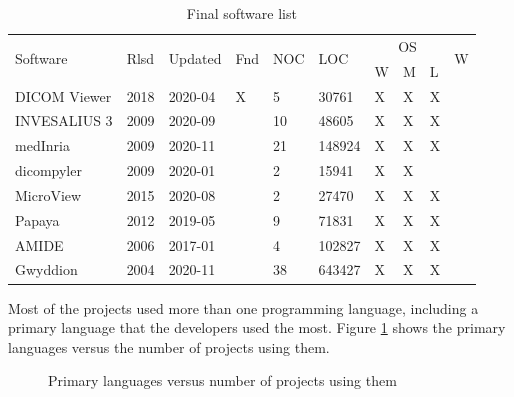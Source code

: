 \begin{table}[H]
\begin{tabular}{llllllllll}
\hline
\multirow{2}{*}{Software} & \multirow{2}{*}{Rlsd} & \multirow{2}{*}{Updated} & \multirow{2}{*}{Fnd} & \multirow{2}{*}{NOC} & \multirow{2}{*}{LOC} & \multicolumn{3}{c}{OS} & \multirow{2}{*}{W} \\ \cline{7-9}
 &  &  &  &  &  & W & M & L &  \\ \hline
DICOM Viewer \cite{Afsar2021} & 2018 & 2020-04 & X & 5 & 30761 & X & X & X &  \\
INVESALIUS 3 \cite{Amorim2015} & 2009 & 2020-09 &  & 10 & 48605 & X & X & X &  \\
medInria \cite{Fillard2012} & 2009 & 2020-11 &  & 21 & 148924 & X & X & X &  \\
dicompyler \cite{Panchal2010} & 2009 & 2020-01 &  & 2 & 15941 & X & X &  &  \\
MicroView \cite{ParallaxInnovations2020} & 2015 & 2020-08 &  & 2 & 27470 & X & X & X &  \\
Papaya \cite{UTHSCSA2019} & 2012 & 2019-05 &  & 9 & 71831 & X & X & X &  \\
AMIDE \cite{Loening2017} & 2006 & 2017-01 &  & 4 & 102827 & X & X & X &  \\
Gwyddion \cite{Nevcas2012} & 2004 & 2020-11 &  & 38 & 643427 & X & X & X &  \\ \hline
\end{tabular}
\caption{\label{tab_final_list}Final software list}
\end{table}

Most of the projects used more than one programming language, including a primary language that the developers used the most. Figure \ref{fig_language} shows the primary languages versus the number of projects using them.

\begin{figure}[H]
\centering
{}
\caption{\label{fig_language}Primary languages versus number of projects using them}
\end{figure}

